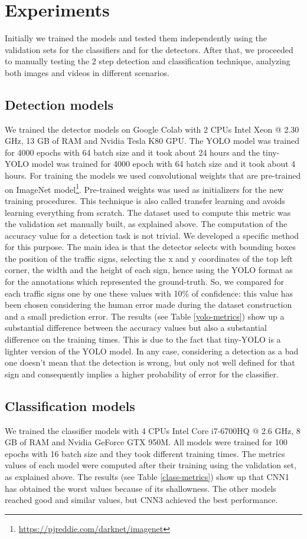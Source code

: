 \documentclass[10pt,twocolumn,letterpaper]{article}
\begin{document}
\section{Experiments}
Initially we trained the models and tested them independently using the validation sets for the classifiers and for the detectors. After that, we proceeded to manually testing the 2 step detection and classification technique, analyzing both images and videos in different scenarios. 


\subsection{Detection models}
We trained the detector models on Google Colab with 2 CPUs Intel Xeon @ 2.30 GHz, 13 GB of RAM and Nvidia Tesla K80 GPU. The YOLO model was trained for 4000 epochs with 64 batch size and it took about 24 hours and the tiny-YOLO model was trained for 4000 epoch with 64 batch size and it took about 4 hours.
For training  the models we used convolutional weights that are pre-trained on ImageNet model\footnote{\url{https://pjreddie.com/darknet/imagenet}}. Pre-trained weights was used as initializers for the new training procedures. This technique is also called transfer learning and avoids learning everything from scratch. The dataset used to compute this metric was the validation set manually built, as explained above. The computation of the accuracy value for a detection task is not trivial. We developed a specific method for this purpose. The main idea is that the detector selects with bounding boxes the position of the traffic signs, selecting the x and y coordinates of the top left corner, the width and the height of each sign, hence using the YOLO format as for the annotations which represented the ground-truth. So, we compared for each traffic signs one by one these values with 10\% of confidence: this value has been chosen considering the human error made during the dataset construction and a small prediction error. 
The results (see Table \ref{yolo-metrics}) show up a substantial difference between the accuracy values but also a substantial difference on the training times. This is due to the fact that tiny-YOLO is a lighter version of the YOLO model. In any case, considering a detection as a bad one doesn't mean that the detection is wrong, but only not well defined for that sign and consequently implies a higher probability of error for the classifier.


\subsection{Classification models}
We trained the classifier models with 4 CPUs Intel Core i7-6700HQ @ 2.6 GHz, 8 GB of RAM and Nvidia GeForce GTX 950M. All models were trained for 100 epochs with 16 batch size and they took different training times. The metrics values of each model were computed after their training using the validation set, as explained above. The results (see Table \ref{class-metrics}) show up that CNN1 has obtained the worst values because of its shallowness. The other models reached good and similar values, but CNN3 achieved the best performance.
\end{document}
